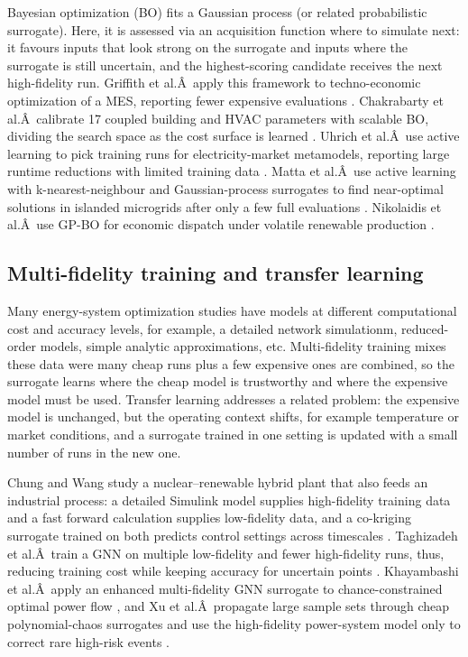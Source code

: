 \documentclass[final,5p,times,twocolumn]{elsarticle}
\begin{document}
Bayesian optimization (BO) fits a Gaussian process (or related
probabilistic surrogate). Here, it is assessed via an acquisition
function where to simulate next: it favours inputs that look strong on
the surrogate and inputs where the surrogate is still uncertain, and the
highest-scoring candidate receives the next high-fidelity run. Griffith
et al.Â~apply this framework to techno-economic optimization of a MES,
reporting fewer expensive evaluations \cite{Griffith2025}. Chakrabarty et
al.Â~calibrate 17 coupled building and HVAC parameters with scalable BO,
dividing the search space as the cost surface is learned
\cite{Chakrabarty2021}. Uhrich et al.Â~use active learning to pick training
runs for electricity-market metamodels, reporting large runtime
reductions with limited training data \cite{Uhrich2026211}. Matta et al.Â~use
active learning with k-nearest-neighbour and Gaussian-process surrogates
to find near-optimal solutions in islanded microgrids after only a few
full evaluations \cite{Matta2026}. Nikolaidis et al.Â~use GP-BO for economic
dispatch under volatile renewable production \cite{Nikolaidis2021}.

\subsection{Multi-fidelity training and transfer learning}
\label{sec:doe:multifidelity}

Many energy-system optimization studies have models at different
computational cost and accuracy levels, for example, a detailed network
simulationm, reduced-order models, simple analytic approximations, etc.
Multi-fidelity training mixes these data were many cheap runs plus a few
expensive ones are combined, so the surrogate learns where the cheap
model is trustworthy and where the expensive model must be used.
Transfer learning addresses a related problem: the expensive model is
unchanged, but the operating context shifts, for example temperature or
market conditions, and a surrogate trained in one setting is updated
with a small number of runs in the new one.

Chung and Wang study a nuclear--renewable hybrid plant that also feeds
an industrial process: a detailed Simulink model supplies high-fidelity
training data and a fast forward calculation supplies low-fidelity data,
and a co-kriging surrogate trained on both predicts control settings
across timescales \cite{Chung2023}. Taghizadeh et al.Â~train a GNN on
multiple low-fidelity and fewer high-fidelity runs, thus, reducing
training cost while keeping accuracy for uncertain points
\cite{Taghizadeh2024}. Khayambashi et al.Â~apply an enhanced multi-fidelity
GNN surrogate to chance-constrained optimal power flow
\cite{Khayambashi202453}, and Xu et al.Â~propagate large sample sets through
cheap polynomial-chaos surrogates and use the high-fidelity power-system
model only to correct rare high-risk events \cite{Xu20203127}.
\end{document}

